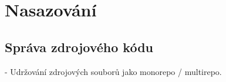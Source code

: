 \section{Nasazování}\label{sec:msa-deployment}

\subsection{Správa zdrojového kódu}\label{subsec:msa-deployment-code}
- Udržování zdrojových souborů jako monorepo / multirepo.
